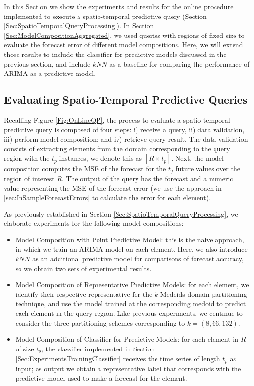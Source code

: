In this Section we show the experiments and results for the online procedure implemented to execute a spatio-temporal predictive query (Section \ref{Sec:SpatioTemporalQueryProcessing}). In Section \ref{Sec:ModelCompositionAggregated}, we used queries with regions of fixed size to evaluate the forecast error of different model compositions. Here, we will extend those results to include the classifier for predictive models discussed in the previous section, and include $kNN$ as a baseline for comparing the performance of ARIMA as a predictive model.

\subsection{Evaluating Spatio-Temporal Predictive Queries}
\label{Sec:ExperimentsQueries}

Recalling Figure \ref{Fig:OnLineQP}, the process to evaluate a spatio-temporal predictive query is composed of four steps: i) receive a query, ii) data validation, iii) perform model composition; and iv) retrieve query result. The data validation consists of extracting elements from the domain corresponding to the query region with the $t_p$ instances, we denote this as $[R \times t_{p}]$. Next, the model composition computes the MSE of the forecast for the $t_{f}$ future values over the region of interest $R$. The output of the query has the forecast and a numeric value representing the MSE of the forecast error (we use the approach in \ref{sec:InSampleForecastErrors} to calculate the error for each element). 

As previously established in Section \ref{Sec:SpatioTemporalQueryProcessing}, we elaborate experiments for the following model compositions:

\begin{itemize}
	\item Model Composition with Point Predictive Model: this is the naive approach, in which we train an ARIMA model on each element. Here, we also introduce $kNN$ as an additional predictive model for comparisons of forecast accuracy, so we obtain two sets of experimental results.
	\item Model Composition of Representative Predictive Models: for each element, we identify their respective representative for the $k$-Medoids domain partitioning technique, and use the model trained at the corresponding medoid to predict each element in the query region. Like previous experiments, we continue to consider the three partitioning schemes corresponding to $k=(8, 66, 132)$.
	\item Model Composition of Classifier for Predictive Models: for each element in $R$ of size $t_{p}$, the classifier implemented in Section \ref{Sec:ExperimentsTrainingClassifier} receives the time series of length $t_{p}$ as input; as output we obtain a representative label that corresponds with the predictive model used to make a forecast for the element.
\end{itemize}

